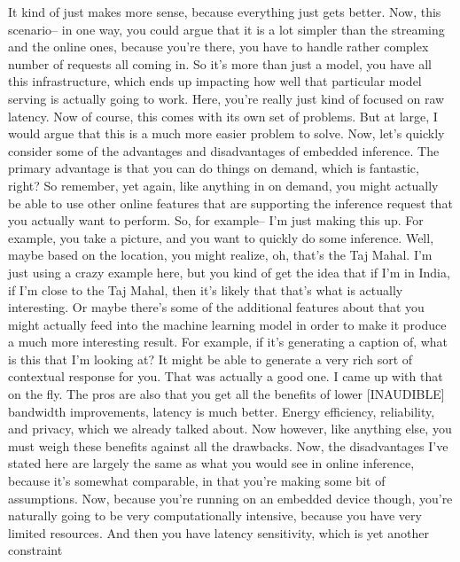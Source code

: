 {{{{{{{    It kind of just makes more sense, because everything just gets better.
    Now, this scenario-- in one way, you could
    argue that it is a lot simpler than the streaming and the online ones,
    because you're there, you have to handle rather complex number of requests
    all coming in.
    So it's more than just a model, you have all this infrastructure,
    which ends up impacting how well that particular model serving is actually
    going to work.
    Here, you're really just kind of focused on raw latency.
    Now of course, this comes with its own set of problems.
    But at large, I would argue that this is a much more easier problem to solve.
    Now, let's quickly consider some of the advantages and disadvantages
    of embedded inference.
    The primary advantage is that you can do things
    on demand, which is fantastic, right?
    So remember, yet again, like anything in on demand,
    you might actually be able to use other online features that
    are supporting the inference request that you actually want to perform.
    So, for example--
    I'm just making this up.
    For example, you take a picture, and you want to quickly do some inference.
    Well, maybe based on the location, you might realize, oh,
    that's the Taj Mahal.
    I'm just using a crazy example here, but you kind of
    get the idea that if I'm in India, if I'm close to the Taj Mahal, then
    it's likely that that's what is actually interesting.
    Or maybe there's some of the additional features
    about that you might actually feed into the machine learning model
    in order to make it produce a much more interesting result.
    For example, if it's generating a caption of,
    what is this that I'm looking at?
    It might be able to generate a very rich sort of contextual response for you.
    That was actually a good one.
    I came up with that on the fly.
    The pros are also that you get all the benefits of lower [INAUDIBLE]
    bandwidth improvements, latency is much better.
    Energy efficiency, reliability, and privacy, which we already talked about.
    Now however, like anything else, you must weigh these benefits
    against all the drawbacks.
    Now, the disadvantages I've stated here are largely
    the same as what you would see in online inference,
    because it's somewhat comparable, in that you're
    making some bit of assumptions.
    Now, because you're running on an embedded device though,
    you're naturally going to be very computationally intensive, because you
    have very limited resources.
    And then you have latency sensitivity, which is yet another constraint
}}}}}}}
